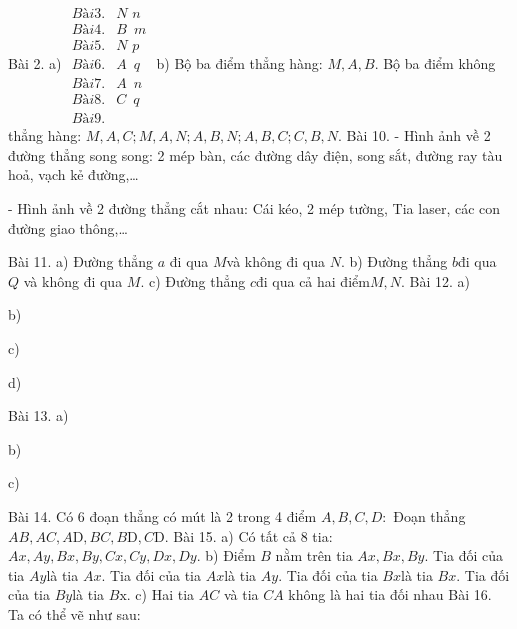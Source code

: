Bài 2. a)
$\begin{align}
	Bài 3.   & N\,\,n \\ 
	Bài 4.  & B\,\,\,m \\ 
	Bài 5.  & N\,\,p \\ 
	Bài 6.  & A\,\,\,q \\ 
	Bài 7.  & A\,\,\,n \\ 
	Bài 8.  & C\,\,\,q \\ 
	Bài 9. \end{align}$
b) Bộ ba điểm thẳng hàng: $M,A,B$.
Bộ ba điểm không thẳng hàng: $M,A,C;M,A,N;A,B,N;A,B,C;C,B,N.$
Bài 10. 
- Hình ảnh về 2 đường thẳng song song: 2 mép bàn, các đường dây điện, song sắt, đường ray tàu hoả, vạch kẻ đường,…

- Hình ảnh về 2 đường thẳng cắt nhau: Cái kéo, 2 mép tường, Tia laser, các con đường giao thông,…

Bài 11. 
a) Đường thẳng $a$ đi qua $M$và không đi qua $N.$
b) Đường thẳng $b$đi qua $Q$ và không đi qua $M.$
c) Đường thẳng $c$đi qua cả hai điểm$M,N.$
Bài 12. 
a) 

b) 

c) 

d) 

Bài 13. 
a) 

b)                

c)

Bài 14. Có 6 đoạn thẳng có mút là 2 trong 4 điểm $A,B,C,D:$
Đoạn thẳng $AB,AC,A\text{D},BC,B\text{D},C\text{D}.$
Bài 15. 
a) Có tất cả 8 tia: $Ax,Ay,Bx,By,Cx,Cy,Dx,Dy.$
b) Điểm $B$ nằm trên tia $Ax,Bx,By.$
Tia đối của tia $Ay$là tia $Ax$.
Tia đối của tia $Ax$là tia $Ay$.
Tia đối của tia $Bx$là tia $Bx$.
Tia đối của tia $By$là tia $B\text{x}$.
c) Hai tia $AC$ và tia $CA$ không là hai tia đối nhau
Bài 16. Ta có thể vẽ như sau: 


